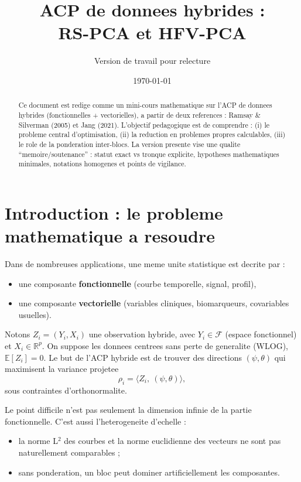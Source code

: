 \documentclass[11pt,a4paper]{article}
\title{ACP de donnees hybrides :\\
RS-PCA et HFV-PCA}
\author{Version de travail pour relecture}
\date{\today}
\begin{document}
\maketitle
\sloppy

\begin{abstract}
Ce document est redige comme un mini-cours mathematique sur l'ACP de donnees
hybrides (fonctionnelles + vectorielles), a partir de deux references :
Ramsay \& Silverman (2005) et Jang (2021).
L'objectif pedagogique est de comprendre :
(i) le probleme central d'optimisation,
(ii) la reduction en problemes propres calculables,
(iii) le role de la ponderation inter-blocs.
La version presente vise une qualite ``memoire/soutenance'' :
statut exact vs tronque explicite, hypotheses mathematiques minimales,
notations homogenes et points de vigilance.
\end{abstract}

\section{Introduction : le probleme mathematique a resoudre}

Dans de nombreuses applications, une meme unite statistique est decrite par :
\begin{itemize}[leftmargin=1.5em]
  \item une composante \textbf{fonctionnelle} (courbe temporelle, signal, profil),
  \item une composante \textbf{vectorielle} (variables cliniques, biomarqueurs, covariables usuelles).
\end{itemize}

Notons $Z_i=(Y_i,X_i)$ une observation hybride, avec
$Y_i\in\mathcal{F}$ (espace fonctionnel) et $X_i\in\mathbb{R}^p$.
On suppose les donnees centrees sans perte de generalite (WLOG),
$\mathbb{E}[Z_i]=0$. Le but de l'ACP hybride est de trouver des directions
$(\psi,\theta)$ qui maximisent la variance projetee
\[
\rho_i=\langle Z_i,\ (\psi,\theta)\rangle,
\]
sous contraintes d'orthonormalite.

Le point difficile n'est pas seulement la dimension infinie de la partie
fonctionnelle. C'est aussi l'heterogeneite d'echelle :
\begin{itemize}[leftmargin=1.5em]
  \item la norme L$^2$ des courbes et la norme euclidienne des vecteurs ne sont
  pas naturellement comparables ;
  \item sans ponderation, un bloc peut dominer artificiellement les composantes.
\end{itemize}
\end{document}
